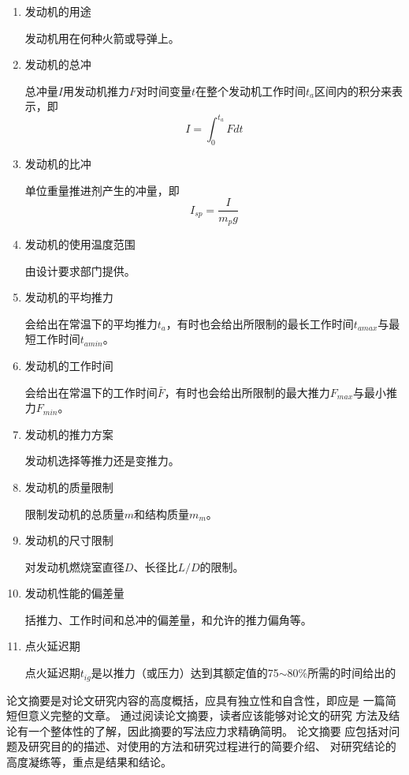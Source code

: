 \begin{enumerate}[leftmargin=2em]
  \item 发动机的用途
  
  发动机用在何种火箭或导弹上。
  \item 发动机的总冲
  
  总冲量$I$用发动机推力$F$对时间变量$t$在整个发动机工作时间$t_{a}$区间内的积分来表示，即
  \[
    I=\int_{0}^{t_{a}} Fdt
  \]

  \item 发动机的比冲
  
  单位重量推进剂产生的冲量，即
  \[
    I_{sp}=\frac{I}{m_{p}g} 
  \]

  \item 发动机的使用温度范围
  
  由设计要求部门提供。

  \item 发动机的平均推力
  
  会给出在常温下的平均推力$t_{a}$，有时也会给出所限制的最长工作时间$t_{amax}$与最短工作时间$t_{amin}$。

  \item 发动机的工作时间
  
  会给出在常温下的工作时间$\bar{F} $，有时也会给出所限制的最大推力$F_{max}$与最小推力$F_{min}$。

  \item 发动机的推力方案
  
  发动机选择等推力还是变推力。

  \item 发动机的质量限制
  
  限制发动机的总质量$m$和结构质量$m_{m}$。

  \item 发动机的尺寸限制
  
  对发动机燃烧室直径$D$、长径比$L/D$的限制。

  \item 发动机性能的偏差量
  
  括推力、工作时间和总冲的偏差量，和允许的推力偏角等。

  \item 点火延迟期
  
  点火延迟期$t_{ig}$是以推力（或压力）达到其额定值的75$\sim$80\%所需的时间给出的

  
\end{enumerate}

论文摘要是对论文研究内容的高度概括，应具有独立性和自含性，即应是 一篇简短但意义完整的文章。
通过阅读论文摘要，读者应该能够对论文的研究 方法及结论有一个整体性的了解，因此摘要的写法应力求精确简明。
论文摘要 应包括对问题及研究目的的描述、对使用的方法和研究过程进行的简要介绍、 对研究结论的高度凝练等，重点是结果和结论。

